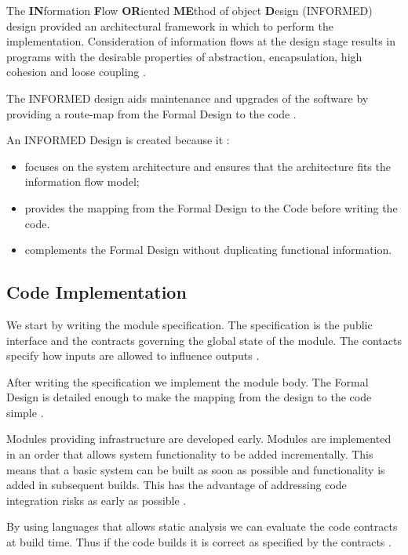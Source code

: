 The \textbf{IN}formation \textbf{F}low \textbf{OR}iented \textbf{ME}thod of
object \textbf{D}esign (INFORMED) design provided an architectural framework
in which to perform the implementation. Consideration of information flows at the
design stage results in programs with the desirable properties of abstraction, 
encapsulation, high cohesion and loose coupling \parencite{Tokeneer}.

The INFORMED design aids maintenance and upgrades of the software by providing a
route-map from the Formal Design to the code \parencite{Tokeneer}.

An INFORMED Design is created because it \parencite{Tokeneer}:
\begin{itemize}
	\item focuses on the system architecture and ensures that the architecture 
		fits the information flow model;
	\item provides the mapping from the Formal Design to the Code before writing
		the code.
	\item complements the Formal Design without duplicating functional information.
\end{itemize}

\subsection{Code Implementation}
We start by writing the module specification. The specification is the public 
interface and the contracts governing the global state of the module. The contacts
specify how inputs are allowed to influence outputs \parencite{Tokeneer}. 

After writing the specification we implement the module body. The Formal Design is
detailed enough to make the mapping from the design to the code simple 
\parencite{Tokeneer}.

Modules providing infrastructure are developed early. Modules are implemented 
in an order that allows system functionality to be added incrementally. This
means that a basic system can be built as soon as possible and functionality is 
added in subsequent builds. This has the advantage of addressing code integration
risks as early as possible \parencite{Tokeneer}.

By using languages that allows static analysis we can evaluate the code 
contracts at build time. Thus if the code builds it is correct as specified by the
contracts \parencite{Tokeneer}.